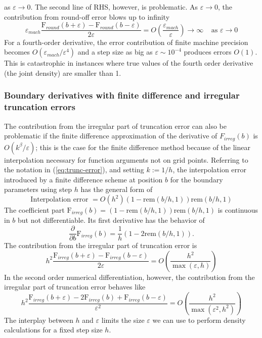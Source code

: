 as $\varepsilon \rightarrow 0$.  The second line of RHS, however, is
problematic. As $\varepsilon \rightarrow 0$, the contribution from
round-off error blows up to infinity
\[
  \varepsilon_{mach}
  \frac{\mbox{F}_{round}(b+\varepsilon)-\mbox{F}_{round}(b-\varepsilon)}{2
    \varepsilon} = O\left(\frac{\varepsilon_{mach}}{\varepsilon}
  \right) \longrightarrow \infty \;\;\;\; \mbox{as } \varepsilon
  \rightarrow 0
\]
For a fourth-order derivative, the error contribution of finite
machine precision becomes $O(\varepsilon_{mach}/\varepsilon^4)$ and a
step size as big as $\varepsilon \sim 10^{-4}$ produces errors
$O(1)$. This is catastrophic in instances where true values of the
fourth order derivative (the joint density) are smaller than 1.

\subsubsection{Boundary derivatives with finite difference and irregular truncation errors} \nonumber
The contribution from the irregular part of truncation error can also
be problematic if the finite difference approximation of the
derivative of $F_{irreg}(b)$ is $O(k^\beta/\varepsilon)$; this is the
case for the finite difference method because of the linear
interpolation necessary for function arguments not on grid
points. Referring to the notation in (\ref{eq:trunc-error}), and
setting $k := 1/h$, the interpolation error introduced by a finite
difference scheme at position $b$ for the boundary parameters using
step $h$ has the general form of
$$\mbox{Interpolation error } = O(h^2) (1-\mbox{rem}(b/h,1)) \mbox{rem}(b/h,1)$$ 
The coefficient part
$\mbox{F}_{irreg}(b) = (1-\mbox{rem}(b/h,1)) \mbox{rem}(b/h,1) $ is
continuous in $b$ but not differentiable. Its first derivative has the
behavior of
$$ \frac{\partial }{\partial b} \mbox{F}_{irreg}(b) =  \frac{1}{h} \left(1-2\mbox{rem}(b/h,1) \right).$$ The contribution from the irregular part of truncation error is 
$$ h^2 \frac{\mbox{F}_{irreg}(b+\varepsilon)-\mbox{F}_{irreg}(b-\varepsilon)}{2 \varepsilon}  = 
O\left(\frac{h^2}{\max(\varepsilon, h)} \right) $$ 
In the second order numerical differentiation, however, the contribution from 
the irregular part of truncation error behaves like 
$$ h^2 \frac{\mbox{F}_{irreg}(b+\varepsilon)-2\mbox{F}_{irreg}(b)
  +\mbox{F}_{irreg}(b-\varepsilon)}{\varepsilon^2 } =
O\left(\frac{h^2}{\max(\varepsilon^2, h^2)} \right) $$ The interplay
between $h$ and $\varepsilon$ limits the size $\varepsilon$ we can use
to perform density calculations for a fixed step size $h$.

